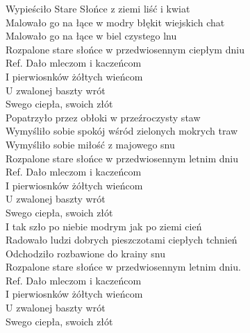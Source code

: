 
Wypieściło Stare Słońce z ziemi liść i kwiat \tab{} \\
Malowało go na łące w modry błękit wiejskich chat  \\
Malowało go na łące w biel czystego lnu \tab{} \\
Rozpalone stare słońce w przedwiosennym ciepłym dniu \\
\hops
Ref. Dało mleczom i kaczeńcom  \\
 I pierwiosnków żółtych wieńcom \\
 U zwalonej baszty wrót \tab{} \\
 Swego ciepła, swoich złót \tab{} \\
\hops
Popatrzyło przez obłoki w przeźroczysty staw\\
Wymyśliło sobie spokój wśród zielonych mokrych traw\\
Wymyśliło sobie miłość z majowego snu \\
Rozpalone stare słońce w przedwiosennym letnim dniu\\
\hops
Ref. Dało mleczom i kaczeńcom\\
 I pierwiosnków żółtych wieńcom\\
 U zwalonej baszty wrót\\
 Swego ciepła, swoich złót\\
\hops
I tak szło po niebie modrym jak po ziemi cień \\
Radowało ludzi dobrych pieszczotami ciepłych tchnień\\
Odchodziło rozbawione do krainy snu   \\
Rozpalone stare słońce w przedwiosennym letnim dniu.\\
\hops
Ref. Dało mleczom i kaczeńcom\\
 I pierwiosnków żółtych wieńcom\\
 U zwalonej baszty wrót\\
 Swego ciepła, swoich złót
